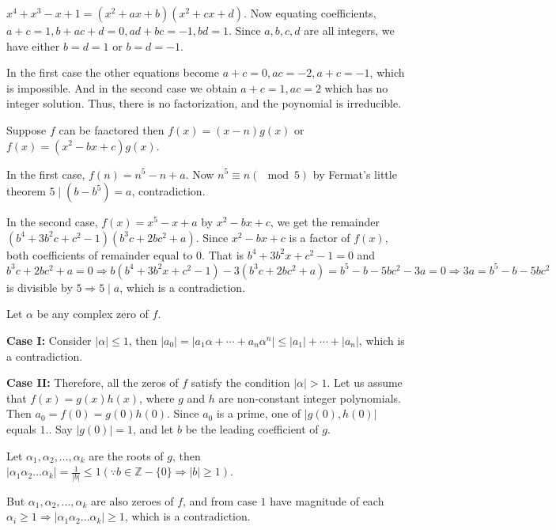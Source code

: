   $x^4 + x^3 - x + 1 = (x^2 + ax + b)(x^2 + cx + d)$. Now equating coefficients, $a + c = 1, b + ac + d = 0,
  ad + bc = -1, bd = 1$. Since $a, b, c, d$ are all integers, we have either $b = d = 1$ or $b = d = -1$.

  In the first case the other equations become $a + c = 0, ac = -2, a + c = -1$, which is impossible. And in
  the second case we obtain $a + c = 1, ac = 2$ which has no integer solution. Thus, there is no
  factorization, and the poynomial is irreducible.
\item Suppose $f$ can be faactored then $f(x) = (x - n)g(x)$ or $f(x) = (x^2 - bx + c)g(x)$.

  In the first case, $f(n) = n^5 - n + a$. Now $n^5\equiv n(\mod 5)$ by Fermat's little theorem $5\mid(b -
  b^5) = a$, contradiction.

  In the second case, $f(x) = x^5 - x + a$ by $x^2 - bx + c$, we get the remainder $(b^4 + 3b^2c + c^2 -
  1)(b^3c + 2bc^2 + a)$. Since $x^2 - bx + c$ is a factor of $f(x)$, both coefficients of remainder equal to
  $0$. That is $b^4 + 3b^2x + c^2 - 1= 0$ and $b^3c + 2bc^2 + a = 0\Rightarrow b(b^4 + 3b^2x + c^2 - 1) -
  3(b^3c + 2bc^2 + a) = b^5 - b - 5bc^2 - 3a = 0\Rightarrow 3a = b^5 - b - 5bc^2$ is divisible by
  $5\Rightarrow 5\mid a$, which is a contradiction.
\item Let $\alpha$ be any complex zero of $f$.

  {\bf Case I:} Consider $|\alpha|\leq 1$, then $|a_0| = |a_1\alpha + \cdots + a_n\alpha^n|\leq |a_1| +
  \cdots + |a_n|$, which is a contradiction.

  {\bf Case II:} Therefore, all the zeros of $f$ satisfy the condition $|\alpha| > 1$. Let us assume that
  $f(x) = g(x)h(x)$, where $g$ and $h$ are non-constant integer polynomials. Then $a_0 = f(0) =
  g(0)h(0)$. Since $a_0$ is a prime, one of $|g(0), h(0)|$ equals $1.$. Say $|g(0)| = 1$, and let $b$ be the
  leading coefficient of $g$.

  Let $\alpha_1, \alpha_2, \ldots, \alpha_k$ are the roots of $g$, then $|\alpha_1\alpha_2\ldots\alpha_k| =
  \frac{1}{|b|}\leq 1(\because b\in\mathbb{Z}- \{0\}\Rightarrow |b|\geq 1)$.

  But $\alpha_1, \alpha_2, \ldots,\alpha_k$ are also zeroes of $f$, and from case $1$ have magnitude of each
  $\alpha_i\geq 1\Rightarrow |\alpha_1\alpha_2\ldots\alpha_k|\geq 1$, which is a contradiction.

